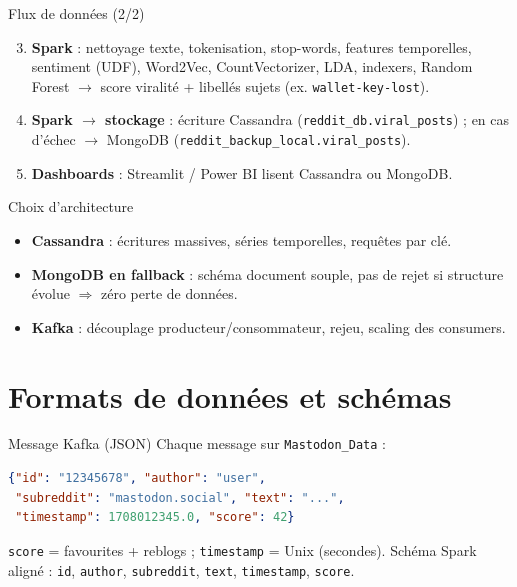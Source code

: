 \documentclass[11pt,aspectratio=169]{beamer}
\begin{document}
\begin{frame}{Flux de données (2/2)}
  \begin{enumerate}[leftmargin=*]\setcounter{enumi}{2}
    \item \textbf{Spark} : nettoyage texte, tokenisation, stop-words, features temporelles, sentiment (UDF), Word2Vec, CountVectorizer, LDA, indexers, Random Forest $\rightarrow$ score viralité + libellés sujets (ex. \texttt{wallet-key-lost}).
    \item \textbf{Spark $\rightarrow$ stockage} : écriture Cassandra (\texttt{reddit\_db.viral\_posts}) ; en cas d'échec $\rightarrow$ MongoDB (\texttt{reddit\_backup\_local.viral\_posts}).
    \item \textbf{Dashboards} : Streamlit / Power BI lisent Cassandra ou MongoDB.
  \end{enumerate}
\end{frame}

\begin{frame}{Choix d'architecture}
  \begin{itemize}[leftmargin=*]
    \item \textbf{Cassandra} : écritures massives, séries temporelles, requêtes par clé.
    \item \textbf{MongoDB en fallback} : schéma document souple, pas de rejet si structure évolue $\Rightarrow$ zéro perte de données.
    \item \textbf{Kafka} : découplage producteur/consommateur, rejeu, scaling des consumers.
  \end{itemize}
\end{frame}

\section{Formats de données et schémas}

\begin{frame}{Message Kafka (JSON)}
  Chaque message sur \texttt{Mastodon\_Data} :
  \begin{lstlisting}[language=json]
{"id": "12345678", "author": "user",
 "subreddit": "mastodon.social", "text": "...",
 "timestamp": 1708012345.0, "score": 42}
  \end{lstlisting}
  \texttt{score} = favourites + reblogs ; \texttt{timestamp} = Unix (secondes). Schéma Spark aligné : \texttt{id}, \texttt{author}, \texttt{subreddit}, \texttt{text}, \texttt{timestamp}, \texttt{score}.
\end{frame}
\end{document}
